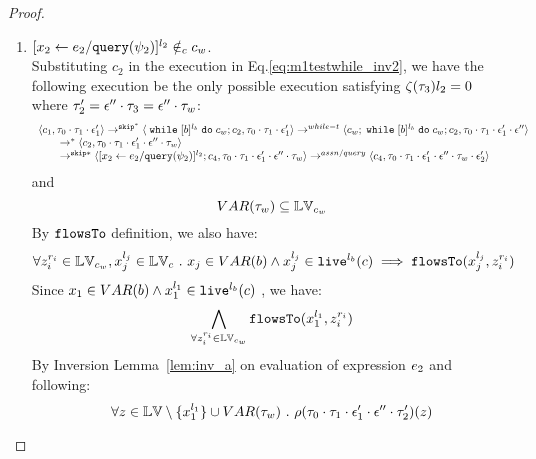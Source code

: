 {\begin{proof}
\begin{subproof}
\begin{enumerate}
    such that 
  $\ewhile [b]^{l_b} \edo c_w \in c_{w2}$ and $[\assign{{x}_2}{\expr_2 / \query(\qexpr_2)}]^{l_2} \in_c c_w$, i.e.,:
  \[
  \exists b_2, l_{b2} \in \mathbb{N}, c_{w2} \st 
  \ewhile [b_2]^{l_{b2}} \edo c_{w2} \in_c c_2 
  \land \ewhile [b]^{l_b} \edo c_w \in c_{w2}
  \land [\assign{{x}_2}{\expr_2 / \query(\qexpr_2)}]^{l_2} \in_c c_w
  \]
%
Then we know there exists $c_5$ and $c_6$ such that:
\[
  c_2 =_c c_5; \ewhile [b_2]^{l_{b2}} \edo c_{w2};c_6
\]
Which is contradict to $c_2 =_c [\eskip^*];[\assign{{x}_2}{\expr_2 / \query(\qexpr_2)}]^{l_2};{c}_4$ by program equality definition.
%
%
 \item $[\mathrel{ {x}_2 \leftarrow e_2 / {\tt query}(\psi_2) }]^{l_2} \notin_c c_w$.
%
\\
%
Substituting $c_2$ in the execution in Eq.\ref{eq:m1testwhile_inv2}, we have the following execution be the only possible execution satisfying $\mathtt{\zeta}(\mathtt{\tau}_3) l_2 = 0$ where $\mathtt{\tau}_2' = \mathtt{\epsilon}'' \cdot \mathtt{\tau}_3 = \mathtt{\epsilon}'' \cdot \mathtt{\tau}_w$:
\[
    \begin{array}{l}   
  \langle c_1, \mathtt{\tau}_0 \cdot \mathtt{\tau}_1 \cdot \mathtt{\epsilon}_1' \rangle 
  \rightarrow^{\mathtt{skip}^*} 
  \langle \;\mathtt{while}\; [b]^{l_b} \;\mathtt{do}\; c_w;{c}_2, \mathtt{\tau}_0 \cdot \mathtt{\tau}_1 \cdot \mathtt{\epsilon}_1' \rangle 
  \rightarrow^{while-t} 
  \langle c_w;\;\mathtt{while}\; [b]^{l_b} \;\mathtt{do}\; c_w;c_2, \mathtt{\tau}_0 \cdot \mathtt{\tau}_1 \cdot \mathtt{\epsilon}_1' \cdot \mathtt{\epsilon}'' \rangle 
  \\
  \qquad \rightarrow^{*} 
  \langle c_2,\mathtt{\tau}_0 \cdot \mathtt{\tau}_1 \cdot \mathtt{\epsilon}_1' \cdot \mathtt{\epsilon}'' \cdot \mathtt{\tau}_w \rangle
  \\
  \qquad \rightarrow^{\mathtt{skip}*} 
  \langle [\mathrel{ {x}_2 \leftarrow e_2 / {\tt query}(\psi_2) }]^{l_2};{c}_4, 
  \mathtt{\tau}_0 \cdot \mathtt{\tau}_1 \cdot \mathtt{\epsilon}_1' \cdot \mathtt{\epsilon}'' \cdot \mathtt{\tau}_w \rangle
  \rightarrow^{assn/query} 
  \langle {c}_4,  \mathtt{\tau}_0 \cdot \mathtt{\tau}_1 \cdot \mathtt{\epsilon}_1' \cdot \mathtt{\epsilon}'' \cdot \mathtt{\tau}_w \cdot \mathtt{\epsilon}_2' \rangle 
\end{array}
\]
and
\[
  VAR{(\mathtt{\tau}_w)} \subseteq \mathbb{LV}_{c_w}
\]
%
By $\mathtt{flowsTo}$ definition, we also have:
\[
  \forall z_i^{r_i} \in \mathbb{LV}_{c_w},  x_j^{l_j} \in \mathbb{LV}_c ~.~ x_j \in VAR(b) \land x_j^{l_j} \in \mathtt{live}^{l_b}(c) \implies
  \mathtt{flowsTo}(x_j^{l_j}, z_i^{r_i})
\]
Since $x_1 \in VAR(b) \land x_1^{l_1} \in \mathtt{live}^{l_b}(c)$ , we have:
\[
  \bigwedge_{\forall z_i^{r_i} \in \mathbb{LV}_{c_w}}
  \mathtt{flowsTo}(x_1^{l_1}, z_i^{r_i})
\]
%
By Inversion Lemma~\ref{lem:inv_a} on evaluation of expression $e_2$ and following: 
\[
  \forall z \in \mathbb{LV} \setminus \{x_1^{l_1}\} \cup VAR{(\mathtt{\tau}_w)} ~.~
  \rho(\mathtt{\tau}_0 \cdot \mathtt{\tau}_1 \cdot \mathtt{\epsilon}_1'\cdot \mathtt{\epsilon}'' \cdot \mathtt{\tau}_2')(z) 
\]
\end{enumerate}
\end{subproof}
\end{proof}}
